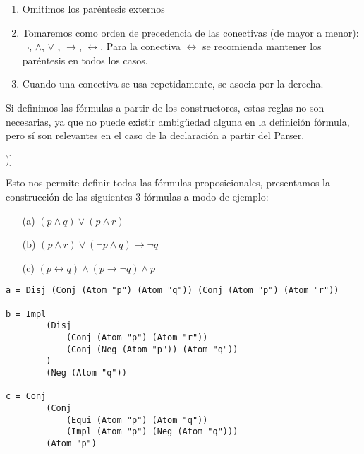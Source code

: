 \documentclass[a4paper]{report}
\begin{document}
\begin{enumerate}
\item Omitimos los paréntesis externos

\item Tomaremos como orden de precedencia de las conectivas (de mayor a menor): $\neg$, $\wedge$, $\vee$ , $\rightarrow$, $\leftrightarrow$. Para la conectiva $\leftrightarrow$ se recomienda mantener los paréntesis en todos los casos.

\item Cuando una conectiva se usa repetidamente, se asocia por la derecha.
\end{enumerate}

Si definimos las fórmulas a partir de los constructores, estas reglas no son necesarias, ya que no puede existir ambigüedad alguna en la definición fórmula, pero sí son relevantes en el caso de la declaración a partir del Parser.

\noindent [Ver la implementación del módulo \textit{LP\_Parser} para ver la implementación de dicho criterio. (\hyperref[sec:A1.LPParser]{\textit{\underline{Ver A1. LP\_Parser}}})]


Esto nos permite definir todas las fórmulas proposicionales, presentamos la construcción de las siguientes 3 fórmulas a modo de ejemplo:

\begin{multicols}{3}
\begin{itemize}
\item[(a)] $ (p \wedge q) \vee (p \wedge r)$
\item[(b)] $ (p \wedge r) \vee (\neg p \wedge q) \rightarrow \neg q$
\item[(c)] $(p \leftrightarrow q) \wedge (p \rightarrow \neg q) \wedge p$
\end{itemize}
\end{multicols}

\begin{lstlisting}[caption= Ejemplos de definición de fórmulas proposicionales.]
a = Disj (Conj (Atom "p") (Atom "q")) (Conj (Atom "p") (Atom "r"))
    
b = Impl 
        (Disj 
            (Conj (Atom "p") (Atom "r")) 
            (Conj (Neg (Atom "p")) (Atom "q"))
        ) 
        (Neg (Atom "q"))

c = Conj 
        (Conj 
            (Equi (Atom "p") (Atom "q")) 
            (Impl (Atom "p") (Neg (Atom "q"))) 
        (Atom "p")
\end{lstlisting}
\end{document}

